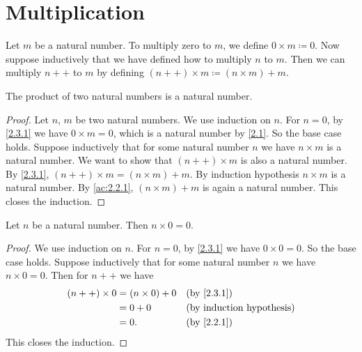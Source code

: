 \section{Multiplication}\label{sec:2.3}

\begin{defn}\label{2.3.1}
  Let \(m\) be a natural number.
  To multiply zero to \(m\), we define \(0 \times m \coloneqq 0\).
  Now suppose inductively that we have defined how to multiply \(n\) to \(m\).
  Then we can multiply \(n++\) to \(m\) by defining \((n++) \times m \coloneqq (n \times m) + m\).
\end{defn}

\begin{ac}\label{ac:2.3.1}
  The product of two natural numbers is a natural number.
\end{ac}

\begin{proof}
  Let \(n\), \(m\) be two natural numbers.
  We use induction on \(n\).
  For \(n = 0\), by \cref{2.3.1} we have \(0 \times m = 0\), which is a natural number by \cref{2.1}.
  So the base case holds.
  Suppose inductively that for some natural number \(n\) we have \(n \times m\) is a natural number.
  We want to show that \((n++) \times m\) is also a natural number.
  By \cref{2.3.1}, \((n++) \times m = (n \times m) + m\).
  By induction hypothesis \(n \times m\) is a natural number.
  By \cref{ac:2.2.1}, \((n \times m) + m\) is again a natural number.
  This closes the induction.
\end{proof}

\begin{ac}\label{ac:2.3.2}
  Let \(n\) be a natural number.
  Then \(n \times 0 = 0\).
\end{ac}

\begin{proof}
  We use induction on \(n\).
  For \(n = 0\), by \cref{2.3.1} we have \(0 \times 0 = 0\).
  So the base case holds.
  Suppose inductively that for some natural number \(n\) we have \(n \times 0 = 0\).
  Then for \(n++\) we have
  \begin{align*}
    (n++) \times 0 & = (n \times 0) + 0 &  & \text{(by \cref{2.3.1})}         \\
                   & = 0 + 0            &  & \text{(by induction hypothesis)} \\
                   & = 0.               &  & \text{(by \cref{2.2.1})}
  \end{align*}
  This closes the induction.
\end{proof}

